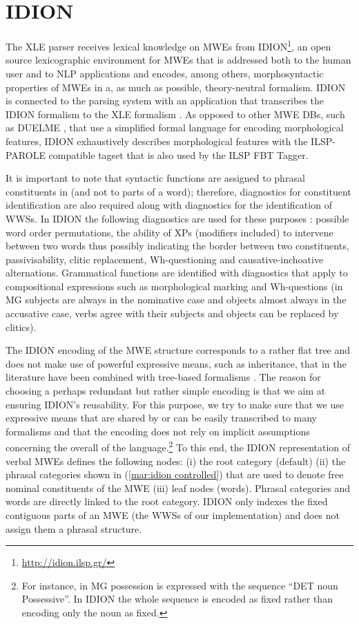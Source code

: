 \documentclass[output=paper]{langsci/langscibook}
\begin{document}
\section{IDION}

The XLE parser  receives lexical knowledge on MWEs from IDION\footnote{\url{http://idion.ilsp.gr/}}, an open source lexicographic environment for MWEs that is addressed both to the human user and to NLP applications and encodes, among others, morphosyntactic properties of MWEs in a, as much as possible, theory-neutral formalism. IDION is connected to the parsing system with an application that transcribes the IDION formalism to the XLE formalism \citep{minos2016}.  
As opposed to other MWE DBs, such as DUELME \citep{gregoire:10}, that use a simplified formal language for encoding morphological features, IDION exhaustively describes morphological features with the ILSP-PAROLE compatible tagset that is also used by the ILSP FBT Tagger. 

It is important to note that syntactic functions are assigned to phrasal constituents in  (and not to parts of a word); therefore, diagnostics for constituent identification are also required along with diagnostics for the identification of WWSs.  In IDION the following diagnostics are used for these purposes \citep{markantonatou2017}: possible word order permutations, the ability of XPs (modifiers included) to intervene between two words thus possibly indicating the border between two constituents, passivisability, clitic replacement, Wh-questioning and causative-inchoative alternations. Grammatical functions are identified with diagnostics that apply to compositional expressions such as morphological marking and Wh-questions (in MG subjects are always in the nominative case and objects almost always in the accusative case, verbs agree with their subjects and objects can be replaced by clitics).

The IDION encoding of the MWE structure corresponds to a rather flat tree and does not make use of powerful expressive means, such as inheritance, that in the literature have been combined with tree-based formalisms \citep{hpsg1,crabbe:etal:13}. The reason for choosing a perhaps redundant but rather simple encoding is that we aim at ensuring IDION's reusability. For this purpose, we try to make sure that we use expressive means that are shared by or can be easily transcribed to many formalisms and that the encoding does not rely on implicit assumptions concerning the overall  of the language.\footnote{For instance, in MG possession is expressed with the sequence ``DET noun Possessive''. In IDION  the whole sequence is encoded as fixed rather than encoding only the noun as fixed.} To this end, the IDION representation of verbal MWEs defines the following nodes: (i) the root category (default) (ii) the phrasal categories shown in (\ref{mar:idion controlled}) that are used to denote free nominal constituents of the MWE (iii) leaf nodes (words). Phrasal categories and words are directly linked to the root category.  IDION only indexes the fixed contiguous parts of an MWE (the WWSs of our implementation) and does not assign them a phrasal structure.
\end{document}
